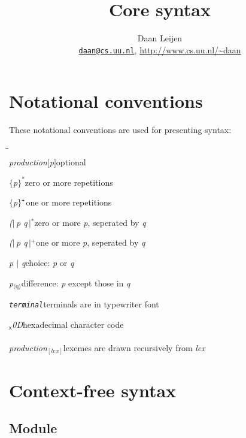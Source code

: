 \documentclass[a4paper,dvips]{article}
\newcommand{\email}[1]{\href{mailto:#1}{\texttt{#1}}}
\newenvironment{productions}%
  {\begin{tabbing}\hspace{2cm}\=\hspace{6cm}\=\kill{}\\}%
  {\end{tabbing}}
\newcommand{\fixed}[1]{\makebox[3.5em]{#1}}
\newcommand{\production}[3]{\nont{#1}\>\fixed{$\rightarrow$}\nont{#2}\>#3\\}
\newcommand{\next}[2]{\strut{}\>\fixed{$|$}\nont{#1}\>#2\\}
\newcommand{\nont}[1]{\textit{#1}}
\newcommand{\pspace}{\hspace{0.25ex}}
\newcommand{\opt}[1]{$[$#1$]$}
\newcommand{\many}[1]{$\{$#1\pspace$\}^*$}
\newcommand{\manyone}[1]{$\{$#1\pspace$\}^\textrm{\tt+}$}
\newcommand{\manyi}[2]{$\{$#2\pspace$\}^{#1}$}
\newcommand{\bananas}[2]{{\rm (}\hspace{-0.5ex}$|\,$#1\pspace$\,|$\hspace{-0.5ex}{\rm )}$^{#2}$}
\newcommand{\sepby}[2]{\bananas{#1 #2}{*}}
\newcommand{\sepbyone}[2]{\bananas{#1 #2}{+}}
\newcommand{\diff}[2]{#1$_{\langle\mbox{#2}\rangle}$}
\newcommand{\term}[1]{{\tt #1}}
\newcommand{\charcode}[1]{{\rm $_\textsf{x}$#1}}
\newcommand{\por}{$|$}
\newcommand{\lex}[2]{\nont{#2}$_{[\nont{#1}]}$}
\begin{document}
\title{Core syntax}
\author{Daan Leijen\\
\email{daan@cs.uu.nl}, \url{http://www.cs.uu.nl/~daan}}
\maketitle

\section{Notational conventions}

These notational conventions are used for presenting syntax:
\begin{productions}
\production{production}{\opt{p}}{optional}
\next{\many{p}}{zero or more repetitions}
\next{\manyone{p}}{one or more repetitions}
\next{\sepby{p}{q}}{zero or more \nont{p}, seperated by \nont{q}}
\next{\sepbyone{p}{q}}{one or more \nont{p}, seperated by \nont{q}}
\next{p \por{} q}{choice: \nont{p} or \nont{q}}
\next{\diff{p}{q}}{difference: \nont{p} except those in \nont{q}}
\next{\term{terminal}}{terminals are in typewriter font}
\next{\charcode{0D}}{hexadecimal character code}
\\
\production{\lex{lex}{production}}{}{lexemes are drawn recursively from \nont{lex}}
\end{productions}


\section{Context-free syntax}

\subsection{Module}
\end{document}
